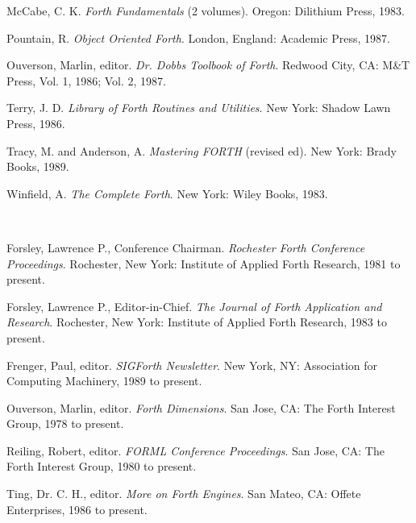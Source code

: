 \begin{description}
\begin{description}
	\item McCabe, C. K.
		\emph{Forth Fundamentals} (2 volumes).
		Oregon: Dilithium Press, 1983.

	\item Pountain, R.
		\emph{Object Oriented Forth}.
		London, England: Academic Press, 1987.

	\item Ouverson, Marlin, editor.
		\emph{Dr. Dobbs Toolbook of Forth}.
		Redwood City, CA: M\&T Press, Vol. 1, 1986; Vol. 2, 1987.

	\item Terry, J. D.
		\emph{Library of Forth Routines and Utilities}.
		New York: Shadow Lawn Press, 1986.

	\item Tracy, M. and Anderson, A.
		\emph{Mastering FORTH} (revised ed).
		New York: Brady Books, 1989.

	\item Winfield, A.
		\emph{The Complete Forth}.
		New York: Wiley Books, 1983.
	\end{description}


\item[Journals, magazines and newsletters]~

	\begin{description}
	\item Forsley, Lawrence P., Conference Chairman.
		\emph{Rochester Forth Conference Proceedings}.
		Rochester, New York: Institute of Applied Forth Research, 1981 to present.

	\item Forsley, Lawrence P., Editor-in-Chief.
		\emph{The Journal of Forth Application and Research}.
		Rochester, New York: Institute of Applied Forth Research, 1983 to present.

	\item Frenger, Paul, editor.
		\emph{SIGForth Newsletter}.
		New York, NY: Association for Computing Machinery, 1989 to present.

	\item Ouverson, Marlin, editor.
		\emph{Forth Dimensions}.
		San Jose, CA: The Forth Interest Group, 1978 to present.

	\item Reiling, Robert, editor.
		\emph{FORML Conference Proceedings}.
		San Jose, CA: The Forth Interest Group, 1980 to present.

	\item Ting, Dr. C. H., editor.
		\emph{More on Forth Engines}.
		San Mateo, CA: Offete Enterprises, 1986 to present.
	\end{description}



\end{description}
